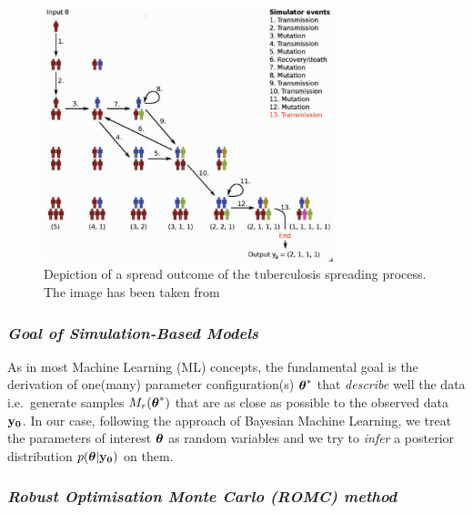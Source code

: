 \begin{figure}[!ht]
    \begin{center}
      \includegraphics[width=0.75\textwidth]{./images/chapter1/tuber_model_1.png}
    \end{center}
    \caption{Depiction of a spread outcome of the tuberculosis spreading process. The image has been taken from \autocite{Lintusaari2017}}
    \label{fig:tuberculosis_model}
\end{figure}

\subsubsection*{\textit{Goal of Simulation-Based Models}}

As in most Machine Learning (ML) concepts, the fundamental goal is the
derivation of one(many) parameter configuration(s) $\boldsymbol{\theta}^*$ that
\textit{describe} well the data i.e.\ generate samples
$M_r(\boldsymbol{\theta}^*)$ that are as close as possible to the observed data
$\mathbf{y_0}$. In our case, following the approach of Bayesian Machine
Learning, we treat the parameters of interest $\boldsymbol{\theta}$ as random
variables and we try to \textit{infer} a posterior distribution
$p(\boldsymbol{\theta}|\mathbf{y_0})$ on them. 

\subsubsection*{\textit{Robust Optimisation Monte Carlo (ROMC) method}}

